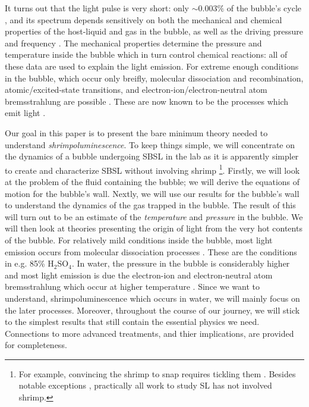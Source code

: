\documentclass[rmp,aps,nofootinbib,superscriptaddress,floatfix]{revtex4-2}
\begin{document}
It turns out that the light pulse is very short: only $\sim0.003\%$ of the bubble's cycle \cite{suslick2008inside}, and its spectrum depends sensitively on both the mechanical and chemical properties of the host-liquid and gas in the bubble, as well as the driving pressure and frequency \cite{brenner2002single,suslick2008inside}. The mechanical properties determine the pressure and temperature inside the bubble which in turn control chemical reactions: all of these data are used to explain the light emission. For extreme enough conditions in the bubble, which occur only breifly, molecular dissociation and recombination, atomic/excited-state transitions, and electron-ion/electron-neutral atom bremsstrahlung are possible \cite{an2009diagnosing,an2008spectral,an2006mechanism,flannigan2005plasma,suslick2008inside,flannigan2006measurement}. These are now known to be the processes which emit light \cite{lohse2018bubble,yasui2018acoustic}.

Our goal in this paper is to present the bare minimum theory needed to understand \emph{shrimpoluminescence}. To keep things simple, we will concentrate on the dynamics of a bubble undergoing SBSL in the lab as it is apparently simpler to create and characterize SBSL without involving shrimp \footnote{ For example, convincing the shrimp to snap requires tickling them \cite{lohse2001snapping,versluis2000snapping,lohse2018bubble}. Besides notable exceptions \cite{tang2019bioinspired}, practically all work to study SL has not involved shrimp.}. Firstly, we will look at the problem of the fluid containing the bubble; we will derive the equations of motion for the bubble's wall. Nextly, we will use our results for the bubble's wall to understand the dynamics of the gas trapped in the bubble. The result of this will turn out to be an estimate of the \emph{temperature} and \emph{pressure} in the bubble. We will then look at theories presenting the origin of light from the very hot contents of the bubble. For relatively mild conditions inside the bubble, most light emission occurs from molecular dissociation processes \cite{}. These are the conditions in e.g. 85\% H$_2$SO$_4$. In water, the pressure in the bubble is considerably higher and most light emission is due the electron-ion and electron-neutral atom bremsstrahlung which occur at higher temperature \cite{}. Since we want to understand, shrimpoluminescence which occurs in water, we will mainly focus on the later processes. Moreover, throughout the course of our journey, we will stick to the simplest results that still contain the essential physics we need. Connections to more advanced treatments, and thier implications, are provided for completeness.
\end{document}
